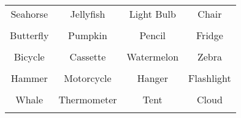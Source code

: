 \documentclass[12pt,a4paper]{article}
\begin{document}
\thispagestyle{empty}
\begin{table}[]
\centering
\Huge
\begin{tabular}{cccc}
 Seahorse& Jellyfish& Light Bulb& Chair\\  & & & \\
 Butterfly& Pumpkin& Pencil& Fridge\\  & & & \\
 Bicycle& Cassette& Watermelon& Zebra\\  & & & \\
 Hammer& Motorcycle& Hanger& Flashlight\\  & & & \\
 Whale& Thermometer& Tent& Cloud\\  & & & \\
\end{tabular}
\end{table}
\end{document}
